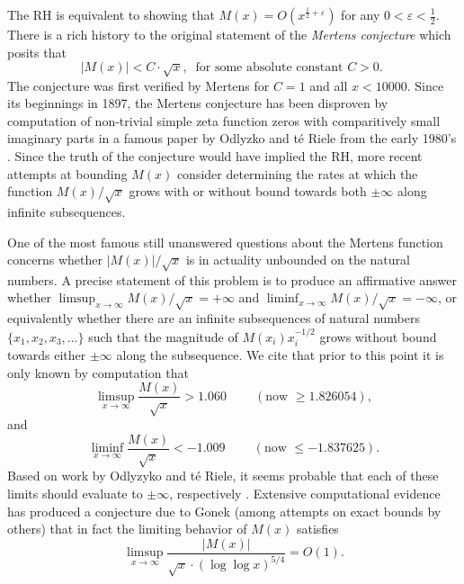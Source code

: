 \documentclass[11pt,reqno,a4letter]{article}
\numberwithin{figure}{section}
\numberwithin{table}{section}
\newcommand{\cf}{\textit{cf.\ }}
\newcommand{\seqnum}[1]{\href{http://oeis.org/#1}{\color{ProcessBlue}{\underline{#1}}}}
\theoremstyle{plain}
\numberwithin{theorem}{section}
\theoremstyle{definition}
\begin{document}
The RH is equivalent to showing that 
$M(x) = O\left(x^{\frac{1}{2}+\varepsilon}\right)$ for any 
$0 < \varepsilon < \frac{1}{2}$. 
There is a rich history to the original statement of the \emph{Mertens conjecture} which 
posits that 
\[ 
|M(x)| < C \cdot \sqrt{x},\ \text{ for some absolute constant $C > 0$. }
\] 
The conjecture was first verified by Mertens for $C = 1$ and all $x < 10000$. 
Since its beginnings in 1897, the Mertens conjecture has been disproven by computation 
of non-trivial simple zeta function zeros with comparitively small imaginary parts in a famous paper by 
Odlyzko and t\'{e} Riele from the early 1980's \cite{ODLYZ-TRIELE}. 
Since the truth of the conjecture would have implied the RH, more recent attempts 
at bounding $M(x)$ consider determining the rates at which the function 
$M(x) / \sqrt{x}$ grows with or without bound towards both $\pm \infty$ along infinite 
subsequences. 

One of the most famous still unanswered questions about the Mertens 
function concerns whether $|M(x)| / \sqrt{x}$ is in actuality unbounded on the 
natural numbers. A precise statement of this 
problem is to produce an affirmative answer whether 
$\limsup_{x \rightarrow \infty} M(x) / \sqrt{x} = +\infty$ and 
$\liminf_{x \rightarrow \infty} M(x) / \sqrt{x} = -\infty$, or 
equivalently whether there are an infinite subsequences of natural numbers 
$\{x_1, x_2, x_3, \ldots\}$ such that the magnitude of 
$M(x_i) x_i^{-1/2}$ grows without bound towards either $\pm \infty$ 
along the subsequence. 
We cite that prior to this point it is only known by computation 
that \cite[\cf \S 4.1]{PRIMEREC} 
\cite[\cf \seqnum{A051400}; \seqnum{A051401}]{OEIS} 
\[
\limsup_{x\rightarrow\infty} \frac{M(x)}{\sqrt{x}} > 1.060\ \qquad (\text{now } \geq 1.826054), 
\] 
and 
\[ 
\liminf_{x\rightarrow\infty} \frac{M(x)}{\sqrt{x}} < -1.009\ \qquad (\text{now } \leq -1.837625). 
\] 
Based on work by Odlyzyko and t\'{e} Riele, it seems probable that 
each of these limits should evaluate to $\pm \infty$, respectively 
\cite{ODLYZ-TRIELE,MREVISITED,ORDER-MERTENSFN,HURST-2017}. 
Extensive computational evidence has produced 
a conjecture due to Gonek (among attempts on exact bounds by others) that in fact the limiting behavior of 
$M(x)$ satisfies \cite{NG-MERTENS}
$$\limsup_{x \rightarrow \infty} \frac{|M(x)|}{\sqrt{x} \cdot (\log\log x)^{5/4}} = O(1).$$ 
\end{document}
